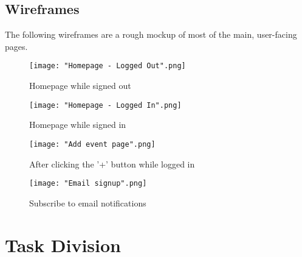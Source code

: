 \documentclass{scrreprt}
\begin{document}
    \clearpage
    \section{Wireframes}
    The following wireframes are a rough mockup of most of the main, user-facing pages.    
    
\begin{figure}[H]
\caption{Homepage while signed out}
\centering
\texttt{[image: "Homepage - Logged Out".png]}
\end{figure}  

\begin{figure}[H]
\caption{Homepage while signed in}
\centering
\texttt{[image: "Homepage - Logged In".png]}
\end{figure}    

\begin{figure}[H]
\caption{After clicking the '+' button while logged in}
\centering
\texttt{[image: "Add event page".png]}
\end{figure}    

\begin{figure}[H]
\caption{Subscribe to email notifications}
\centering
\texttt{[image: "Email signup".png]}
\end{figure}    
        
\chapter{Task Division}
\end{document}
